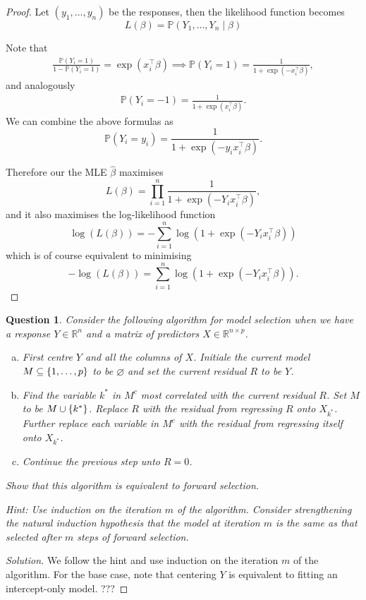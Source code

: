 \documentclass{article}
\theoremstyle{plain}
\newtheorem{question}{Question}
\theoremstyle{remark}
\newenvironment{solution}{\begin{proof}[Solution]\renewcommand\qedsymbol{}}{\end{proof}}
\renewcommand{\emptyset}{\varnothing}
\newcommand{\Bb}{\mathbb}
\newcommand{\PP}{\Bb P}
\newcommand{\RR}{\Bb R}
\newcommand{\T}{^\top} %
\begin{document}
\begin{proof}
	Let $(y_1, \dotsc, y_n)$ be the responses, then the likelihood function becomes
	\[
	L(\beta) = \PP(Y_1, \dotsc, Y_n \mid \beta)
	\]
	
	Note that
	\begin{align*}
		\frac{\PP(Y_i = 1)}{1 - \PP(Y_i = 1)} = \exp(x_i\T\beta) \implies \PP(Y_i = 1) = \frac{1}{1 + \exp(-x_i\T \beta)},
	\end{align*}
and analogously
\begin{align*}
	\PP(Y_i = -1) =  \frac{1}{1 + \exp(x_i\T\beta)}. 
\end{align*}
We can combine the above formulas as
\[
\PP(Y_i = y_i) = \frac{1}{1 + \exp(-y_i x_i\T\beta)}. 
\]

Therefore our the MLE $\hat\beta$ maximises
\[
L(\beta) = \prod_{i=1}^n \frac{1}{1 + \exp(-Y_i x_i\T\beta)}, 
\]
and it also maximises the log-likelihood function
\[
\log(L(\beta)) = - \sum_{i=1}^n \log(1 + \exp(-Y_i x_i\T\beta))
\]
which is of course equivalent to minimising
\[
-\log(L(\beta)) = \sum_{i=1}^n \log(1 + \exp(-Y_i x_i\T\beta)). 
\]
\end{proof}

\begin{question}
	Consider the following algorithm for model selection when we have a response $Y \in \RR^n$ and a matrix of predictors $X \in \RR^{n \times p}$.
	\begin{enumerate}[(a)]
		\item First centre $Y$ and all the columns of $X$. Initiale the current model $M \subseteq \qty{1, \dotsc, p}$ to be $\emptyset$ and set the current residual $R$ to be $Y$. 
		\item Find the variable $k^*$ in $M^c$ most correlated with the current residual $R$. Set $M$ to be $M \cup \qty{k^*}$. Replace $R$ with the residual from regressing $R$ onto $X_{k^*}$. Further replace each variable in $M^c$ with the residual from regressing itself onto $X_{k^*}$.
		\item Continue the previous step unto $R = 0$. 
	\end{enumerate}
Show that this algorithm is equivalent to forward selection.

\emph{Hint:} Use induction on the iteration $m$ of the algorithm. Consider strengthening the natural induction hypothesis that the model at iteration $m$ is the same as that selected after $m$ steps of forward selection. 
\end{question}

\begin{solution}
We follow the hint and use induction on the iteration $m$ of the algorithm. For the base case, note that centering $Y$  is equivalent to fitting an intercept-only model. ???
\end{solution}
\end{document}
